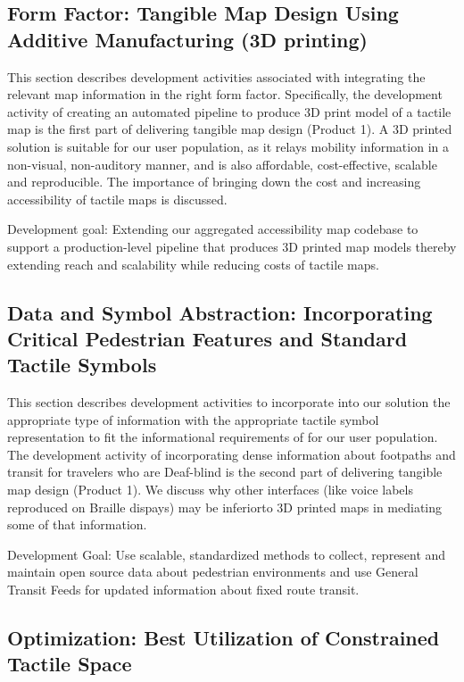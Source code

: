 \subsection{Form Factor: Tangible Map Design Using Additive Manufacturing (3D printing)}
This section describes development activities associated with integrating the relevant map information in the right form factor. Specifically, the development activity of creating an automated pipeline to produce 3D print model of a tactile map is the first part of delivering tangible map design (Product 1). A 3D printed solution is suitable for our user population, as it relays mobility information in a non-visual, non-auditory manner, and is also affordable, cost-effective, scalable and reproducible.  The importance of bringing down the cost and increasing accessibility of tactile maps is discussed.

Development goal: Extending our aggregated accessibility map codebase to support a production-level pipeline that produces 3D printed map models thereby extending reach and scalability while reducing costs of tactile maps.  

\label{sec:fabrication}


\subsection{Data and Symbol Abstraction: Incorporating Critical Pedestrian Features and Standard Tactile Symbols}

This section describes development activities to incorporate into our solution the appropriate type of information with the appropriate tactile symbol representation to fit the informational requirements of for our user population. 
The development activity of incorporating dense information about footpaths and transit for travelers who are Deaf-blind is the second part of delivering tangible map design (Product 1). 
We discuss why other interfaces (like voice labels reproduced on Braille dispays) may be inferiorto 3D printed maps in mediating some of that information.

Development Goal: Use scalable, standardized methods to collect, represent and maintain open source data about pedestrian environments and use General Transit Feeds for updated information about fixed route transit.

\label{sec:mapping-data}


\subsection{Optimization: Best Utilization of Constrained Tactile Space} 

